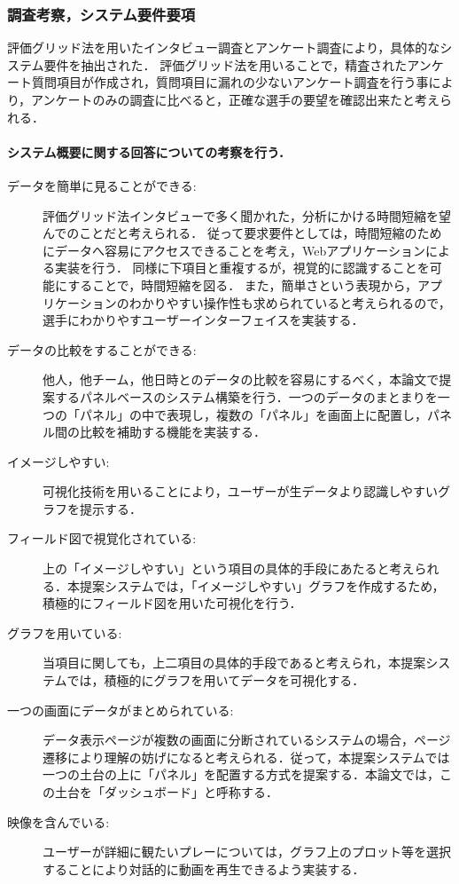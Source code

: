 \documentclass[sotsuron]{kuee}
\begin{document}
			\subsubsection{調査考察，システム要件要項}
				評価グリッド法を用いたインタビュー調査とアンケート調査により，具体的なシステム要件を抽出された．
				評価グリッド法を用いることで，精査されたアンケート質問項目が作成され，質問項目に漏れの少ないアンケート調査を行う事により，アンケートのみの調査に比べると，正確な選手の要望を確認出来たと考えられる．
					\paragraph {システム概要に関する回答についての考察を行う．}
						\begin{description}
							\item [データを簡単に見ることができる:]
							評価グリッド法インタビューで多く聞かれた，分析にかける時間短縮を望んでのことだと考えられる．
							従って要求要件としては，時間短縮のためにデータへ容易にアクセスできることを考え，Webアプリケーションによる実装を行う．
							同様に下項目と重複するが，視覚的に認識することを可能にすることで，時間短縮を図る．
							また，簡単さという表現から，アプリケーションのわかりやすい操作性も求められていると考えられるので，選手にわかりやすユーザーインターフェイスを実装する．
							\item [データの比較をすることができる:]
							他人，他チーム，他日時とのデータの比較を容易にするべく，本論文で提案するパネルベースのシステム構築を行う．一つのデータのまとまりを一つの「パネル」の中で表現し，複数の「パネル」を画面上に配置し，パネル間の比較を補助する機能を実装する．
							\item [イメージしやすい:]
							可視化技術を用いることにより，ユーザーが生データより認識しやすいグラフを提示する．
							\item [フィールド図で視覚化されている:]
							上の「イメージしやすい」という項目の具体的手段にあたると考えられる．本提案システムでは，「イメージしやすい」グラフを作成するため，積極的にフィールド図を用いた可視化を行う．
							\item [グラフを用いている:]
							当項目に関しても，上二項目の具体的手段であると考えられ，本提案システムでは，積極的にグラフを用いてデータを可視化する．
							\item [一つの画面にデータがまとめられている:]
							データ表示ページが複数の画面に分断されているシステムの場合，ページ遷移により理解の妨げになると考えられる．従って，本提案システムでは一つの土台の上に「パネル」を配置する方式を提案する．本論文では，この土台を「ダッシュボード」と呼称する．
							\item [映像を含んでいる:]
							ユーザーが詳細に観たいプレーについては，グラフ上のプロット等を選択することにより対話的に動画を再生できるよう実装する．
						\end{description}
\end{document}
